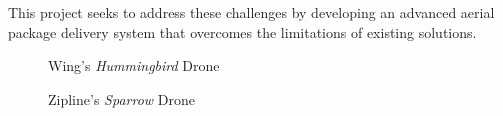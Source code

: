 \documentclass[12pt]{article}
\begin{document}
This project seeks to address these challenges by developing an advanced aerial package delivery system that overcomes the limitations of existing solutions.

\begin{figure}[H]
    \centering
    \begin{minipage}{0.48\textwidth}
        \centering
        \caption{Wing's \textit{Hummingbird} Drone}
        \label{fig:wing-drone}
    \end{minipage}\hfill
    \begin{minipage}{0.48\textwidth}
        \centering
        \caption{Zipline's \textit{Sparrow} Drone}
        \label{fig:zipline-drone}
    \end{minipage}
\end{figure}
\end{document}
